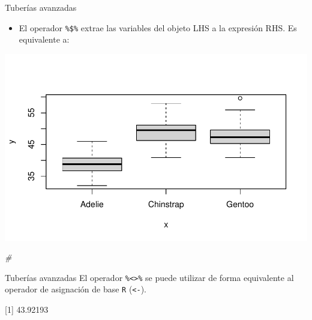 \documentclass[
  ignorenonframetext,
  aspectratio=169]{beamer}
\newenvironment{Shaded}{\begin{snugshade}}{\end{snugshade}}
\newcommand{\AttributeTok}[1]{\textcolor[rgb]{0.77,0.63,0.00}{#1}}
\newcommand{\CommentTok}[1]{\textcolor[rgb]{0.56,0.35,0.01}{\textit{#1}}}
\newcommand{\FunctionTok}[1]{\textcolor[rgb]{0.00,0.00,0.00}{#1}}
\newcommand{\NormalTok}[1]{#1}
\newcommand{\OtherTok}[1]{\textcolor[rgb]{0.56,0.35,0.01}{#1}}
\newcommand{\SpecialCharTok}[1]{\textcolor[rgb]{0.00,0.00,0.00}{#1}}
\providecommand{\tightlist}{%
  \setlength{\itemsep}{0pt}\setlength{\parskip}{0pt}}
\begin{document}
\begin{frame}[fragile]{Tuberías avanzadas}
\protect\hypertarget{tuberuxedas-avanzadas}{}
\begin{itemize}
\tightlist
\item
  El operador \texttt{\%\$\%} extrae las variables del objeto LHS a la
  expresión RHS. Es equivalente a:
\end{itemize}

\begin{Shaded}
\end{Shaded}

\begin{Shaded}
\end{Shaded}

\begin{center}\includegraphics[width=0.5\linewidth]{tidyverse_AD_files/figure-beamer/unnamed-chunk-27-1} \end{center}

\begin{Shaded}
\begin{Highlighting}[]
\CommentTok{\# }
\end{Highlighting}
\end{Shaded}
\end{frame}

\begin{frame}[fragile]{Tuberías avanzadas}
\protect\hypertarget{tuberuxedas-avanzadas-1}{}
El operador \texttt{\%\textless{}\textgreater{}\%} se puede utilizar de
forma equivalente al operador de asignación de base \texttt{R}
(\texttt{\textless{}-}).

\begin{Shaded}
\end{Shaded}

{[}1{]} 43.92193
\end{frame}
\end{document}
